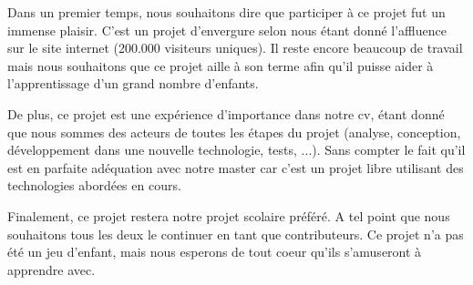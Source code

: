 Dans un premier temps, nous souhaitons dire que participer à ce projet fut un immense plaisir. C'est un projet d'envergure selon nous étant donné l'affluence sur le site internet (200.000 visiteurs uniques). Il reste encore beaucoup de travail mais nous souhaitons que ce projet aille à son terme afin qu'il puisse aider à l'apprentissage d'un grand nombre d'enfants.

De plus, ce projet est une expérience d'importance dans notre cv, étant donné que nous sommes des acteurs de toutes les étapes du projet (analyse, conception, développement dans une nouvelle technologie, tests, ...).
Sans compter le fait qu'il est en parfaite adéquation avec notre master car c'est un projet libre utilisant des technologies abordées en cours.

Finalement, ce projet restera notre projet scolaire préféré. A tel point que nous souhaitons tous les deux le continuer en tant que contributeurs. Ce projet n'a pas été un jeu d'enfant, mais nous esperons de tout coeur qu'ils s'amuseront à apprendre avec.
